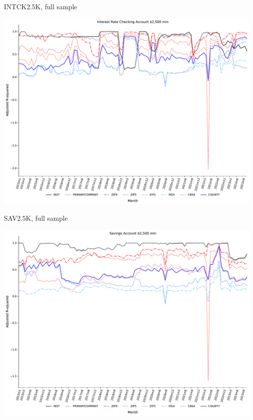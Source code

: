 \documentclass{beamer}
\begin{document}
\begin{frame}{INTCK2.5K, full sample}
\begin{center}
\includegraphics[width=1\textwidth]{figure/all_sample_939605/all_fixed_effects/INTCK2_5K_adjusted_R2_all_fixed_effects.pdf} 
\end{center}
\end{frame}



\begin{frame}{SAV2.5K, full sample}
\begin{center}
\includegraphics[width=1\textwidth]{figure/all_sample_939605/all_fixed_effects/SAV2_5K_adjusted_R2_all_fixed_effects.pdf} 
\end{center}
\end{frame}
\end{document}
